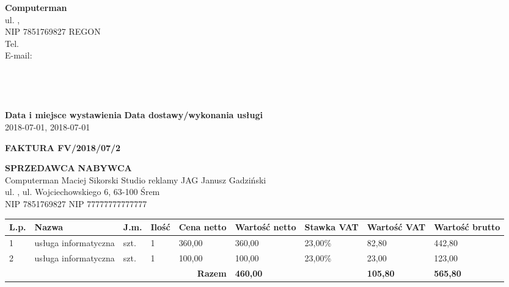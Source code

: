 \documentclass[a4paper,10pt]{article}
\date{}
\begin{document}
    \noindent
    \textbf{Computerman}\\
    ul.  ,  \\
    NIP 7851769827 REGON \\
    Tel. \\
    E-mail: \\
    \\
    \\
    
    \\
    \\
  
\noindent
    \textbf{Data i miejsce wystawienia}		\hfill \textbf{Data dostawy/wykonania usługi}\\
    2018-07-01, 							        \hfill	2018-07-01\\
  
    \begin{center}
    \textbf{\huge{FAKTURA FV/2018/07/2}}
    \end{center}
    \vspace{2cm}
  
    \noindent
    \textbf{SPRZEDAWCA}						\hfill \textbf{NABYWCA}\\
    Computerman Maciej Sikorski					                        \hfill Studio reklamy JAG Janusz Gadziński\\
    ul.  ,  								            \hfill ul. Wojciechowskiego 6, 63-100 Śrem\\
    NIP 7851769827								        \hfill NIP 77777777777777\\
  
    \begin{table}[H]
    \raggedleft
    \begin{tabular}{| p{} | p{}  | p{} | p{}| p{} | p{} | p{} | p{} | p{} |}
    \hline
    \textbf{L.p.} & \textbf{Nazwa} & \textbf{J.m.} & \textbf{Ilość} & \textbf{Cena netto} & \textbf{Wartość netto} & \textbf{Stawka VAT} & \textbf{Wartość VAT} & \textbf{Wartość brutto} \\ \hline
  
    1 & usługa informatyczna & szt. & 1 & 360,00 & 360,00 & 23,00\% & 82,80 & 442,80 \\ \hline
  
    2 & usługa informatyczna & szt. & 1 & 100,00 & 100,00 & 23,00\% & 23,00 & 123,00 \\ \hline
  
    \hline
    \multicolumn{5}{|r|}{\textbf{Razem}} & \textbf{460,00} & \cellcolor[gray]{0.9} & \textbf{105,80} & \textbf{565,80} \\ \hline
    \end{tabular}
    \end{table}
  
\end{document}
